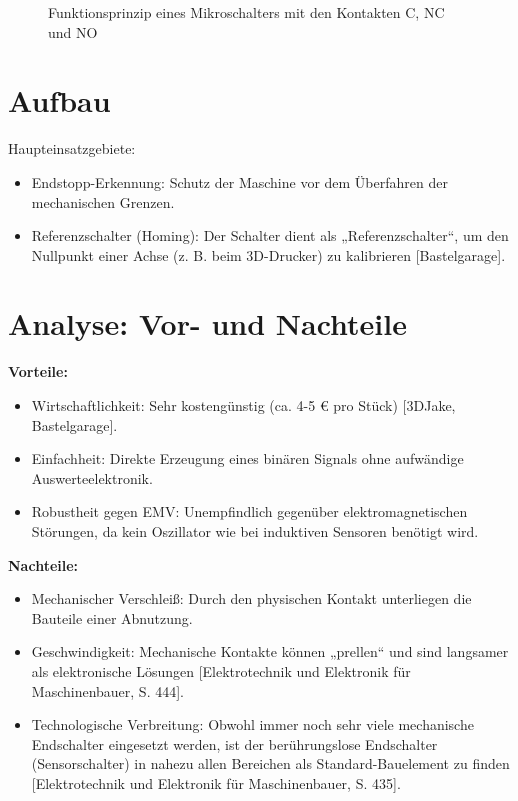 \begin{figure}[H]
	\centering
	
	\caption{Funktionsprinzip eines Mikroschalters mit den Kontakten C, NC und NO}
	\label{fig:microswitch_principle}
\end{figure}
\newpage
\section{Aufbau}



Haupteinsatzgebiete:

\begin{itemize}
	\item Endstopp-Erkennung: Schutz der Maschine vor dem Überfahren der mechanischen Grenzen.
	\item Referenzschalter (Homing): Der Schalter dient als „Referenzschalter“, um den Nullpunkt einer Achse (z. B. beim 3D-Drucker) zu kalibrieren [Bastelgarage].
\end{itemize}

\section{Analyse: Vor- und Nachteile}

\textbf{Vorteile:}

\begin{itemize}
	\item Wirtschaftlichkeit: Sehr kostengünstig (ca. 4-5 € pro Stück) [3DJake, Bastelgarage].
	\item Einfachheit: Direkte Erzeugung eines binären Signals ohne aufwändige Auswerteelektronik.
	\item Robustheit gegen EMV: Unempfindlich gegenüber elektromagnetischen Störungen, da kein Oszillator wie bei induktiven Sensoren benötigt wird.
\end{itemize}

\textbf{Nachteile:}

\begin{itemize}
	\item Mechanischer Verschleiß: Durch den physischen Kontakt unterliegen die Bauteile einer Abnutzung.
	\item Geschwindigkeit: Mechanische Kontakte können „prellen“ und sind langsamer als elektronische Lösungen [Elektrotechnik und Elektronik für Maschinenbauer, S. 444].
	\item Technologische Verbreitung: Obwohl immer noch sehr viele mechanische Endschalter eingesetzt werden, ist der berührungslose Endschalter (Sensorschalter) in nahezu allen Bereichen als Standard-Bauelement zu finden [Elektrotechnik und Elektronik für Maschinenbauer, S. 435].
\end{itemize}